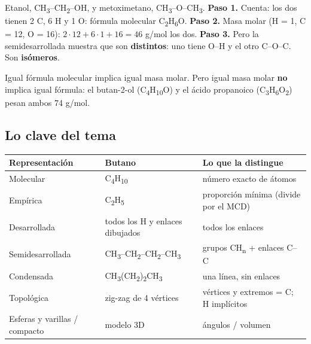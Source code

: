 \begin{ejemplo} Etanol, CH\textsubscript{3}--CH\textsubscript{2}--OH, y metoximetano, CH\textsubscript{3}--O--CH\textsubscript{3}. \textbf{Paso 1.} Cuenta: los dos tienen 2 C, 6 H y 1 O: fórmula molecular C\textsubscript{2}H\textsubscript{6}O. \textbf{Paso 2.} Masa molar (H = 1, C = 12, O = 16): $2 \cdot 12 + 6 \cdot 1 + 16 = 46$ g/mol los dos. \textbf{Paso 3.} Pero la semidesarrollada muestra que son \textbf{distintos}: uno tiene O--H y el otro C--O--C. Son \textbf{isómeros}.\end{ejemplo}
  
\begin{ojo} Igual fórmula molecular implica igual masa molar. Pero igual masa molar \textbf{no} implica igual fórmula: el butan-2-ol (C\textsubscript{4}H\textsubscript{10}O) y el ácido propanoico (C\textsubscript{3}H\textsubscript{6}O\textsubscript{2}) pesan ambos 74 g/mol.\end{ojo}
\subsection{Lo clave del tema}
\begin{center}\small
\begin{tabularx}{\linewidth}{@{}>{\raggedright\arraybackslash\hsize=0.90\hsize}X>{\raggedright\arraybackslash\hsize=0.96\hsize}X>{\raggedright\arraybackslash\hsize=1.14\hsize}X@{}}
\toprule
\textbf{Representación} & \textbf{Butano} & \textbf{Lo que la distingue} \\
\midrule
Molecular & C\textsubscript{4}H\textsubscript{10} & número exacto de átomos \\
Empírica & C\textsubscript{2}H\textsubscript{5} & proporción mínima (divide por el MCD) \\
Desarrollada & todos los H y enlaces dibujados & todos los enlaces \\
Semidesarrollada & CH\textsubscript{3}--CH\textsubscript{2}--CH\textsubscript{2}--CH\textsubscript{3} & grupos CH\textsubscript{n} + enlaces C--C \\
Condensada & CH\textsubscript{3}(CH\textsubscript{2})\textsubscript{2}CH\textsubscript{3} & una línea, sin enlaces \\
Topológica & zig-zag de 4 vértices & vértices y extremos = C; H implícitos \\
Esferas y varillas / compacto & modelo 3D & ángulos / volumen \\
\bottomrule
\end{tabularx}
\end{center}
  

